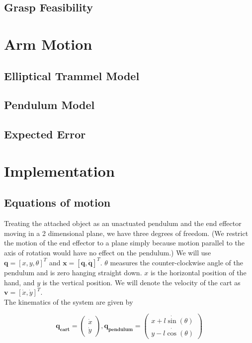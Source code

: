 \documentclass{article}
\begin{document}
\subsection{Grasp Feasibility}

\section{Arm Motion}

\subsection{Elliptical Trammel Model}

\subsection{Pendulum Model}

\subsection{Expected Error}

\section{Implementation}






\subsection{Equations of motion}

Treating the attached object as an unactuated pendulum and the end
effector moving in a 2 dimensional plane, we have three degrees of
freedom. (We restrict the motion of the end effector to a plane simply
because motion parallel to the axis of rotation would have no effect
on the pendulum.) We will use $\mathbf{q} = [x,y,\theta]^T$ and
$\mathbf{x} =[\mathbf{q},\mathbf{\dot{q}}]^T$. $\theta$ measures the
counter-clockwise angle of the pendulum and is zero hanging straight
down. $x$ is the horizontal position of the hand, and $y$ is the
vertical position. We will denote the velocity of the cart as $\mathbf{v} = [\dot{x},\dot{y}]^T$. \\

The kinematics of the system are given by 

\begin{equation}\label{eq:state}
\mathbf{q_{cart}} = \begin{pmatrix} \dot{x} \\ \dot{y} \end{pmatrix}, \mathbf{q_{pendulum}} = \begin{pmatrix} \dot{x+l\sin(\theta)} \\ \dot{y-l\cos(\theta)} \end{pmatrix}
\end{equation}
\end{document}
